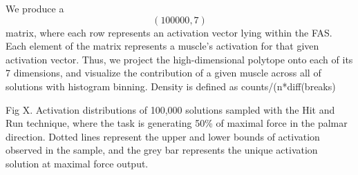 

We produce a $$(100000,7)$$ matrix, where each row represents an activation vector lying within the FAS.
Each element of the matrix represents a muscle's activation for that given activation vector. 
 Thus, we project the high-dimensional polytope onto each of its 7 dimensions, and visualize the contribution of a given muscle across all of solutions with histogram binning. 
 Density is defined as counts/(n*diff(breaks)



Fig X. Activation distributions of 100,000 solutions sampled with the Hit and Run technique, where the task is generating 50\% of maximal force in the palmar direction.
Dotted lines represent the upper and lower bounds of activation observed in the sample, and the grey bar represents the unique activation solution at maximal force output.
